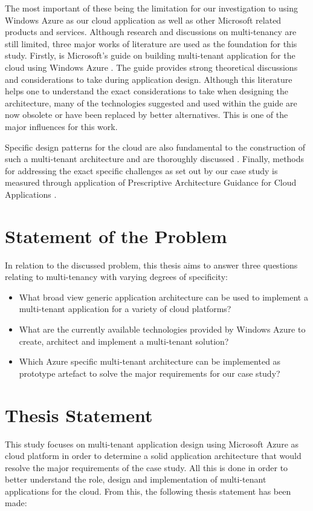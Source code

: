 The most important of these being the limitation for our investigation to using Windows Azure as our cloud application as well as other Microsoft related products and services. Although research and discussions on multi-tenancy are still limited, three major works of literature are used as the foundation for this study. Firstly, is Microsoft's guide on building multi-tenant application for the cloud using Windows Azure \cite{Betts2012-ad}. The guide provides strong theoretical discussions and considerations to take during application design. Although this literature helps one to understand the exact considerations to take when designing the architecture, many of the technologies suggested and used within the guide are now obsolete or have been replaced by better alternatives. This is one of the major influences for this work.

Specific design patterns for the cloud are also fundamental to the construction of such a multi-tenant architecture and are thoroughly discussed \cite{Wilder2012-so}. Finally, methods for addressing the exact specific challenges as set out by our case study is measured through application of Prescriptive Architecture Guidance for Cloud Applications \cite{Homer2014}. 

\section{Statement of the Problem}
In relation to the discussed problem, this thesis aims to answer three questions relating to multi-tenancy with varying degrees of specificity:
\begin{itemize}
\item What broad view generic application architecture can be used to implement a multi-tenant application for a variety of cloud platforms?
\item What are the currently available technologies provided by Windows Azure to create, architect and implement a multi-tenant solution?
\item Which Azure specific multi-tenant architecture can be implemented as prototype  artefact to solve the major requirements for our case study?
\end{itemize}

\section{Thesis Statement}
This study focuses on multi-tenant application design using Microsoft Azure as cloud platform in order to determine a solid application architecture that would resolve the major requirements of the case study. All this is done in order to better understand the role, design and implementation of multi-tenant applications for the cloud. From this, the following thesis statement has been made:
 
